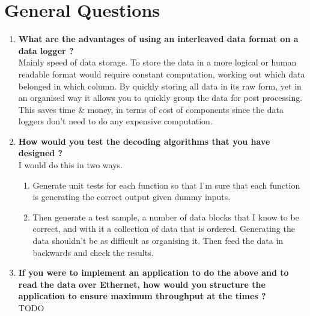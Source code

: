 \documentclass{article}
\begin{document}
	\part{General Questions}
	\begin{enumerate}
		\item \textbf{What are the advantages of using an interleaved data format on a data logger ?}\\
		Mainly speed of data storage. To store the data in a more logical or human readable format would require constant computation, working out which data belonged in which column. By quickly storing all data in its raw form, yet in an organised way it allows you to quickly group the data for post processing. This saves time \& money, in terms of cost of components since the data loggers don't need to do any expensive computation.
		\item \textbf{How would you test the decoding algorithms that you have designed ?}\\
		I would do this in two ways.
		\begin{enumerate}
			\item Generate unit tests for each function so that I'm sure that each function is generating the correct output given dummy inputs.
			\item Then generate a test sample, a number of data blocks that I know to be correct, and with it a collection of data that is ordered. Generating the data shouldn't be as difficult as organising it. Then feed the data in backwards and check the results.
		\end{enumerate} 
	\item \textbf{If you were to implement an application to do the above and to read the data over Ethernet, how would you structure the application to ensure maximum throughput at the times ?}\\
	TODO 
	\end{enumerate}
\end{document}
